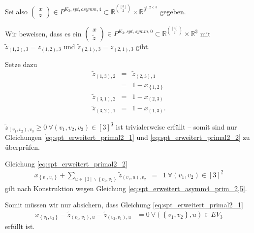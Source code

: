 \documentclass[10p,a4paper,BCOR = 12mm, DIV=15]{scrbook}
\begin{document}
{\begin{bew}
Sei also $\left(\begin{array}{c}
x \\
z
\end{array}\right) \in P^{K_3, spt, asymm, 4} \subset \mathbb{R}^{\left[3\right] \choose 2} \times \mathbb{R}^{\underline{3}^{1, 2 < 3}}$ gegeben.

Wir beweisen, dass es ein $\left(
\begin{array}{c}
x \\
\widetilde{z}
\end{array}
\right) \in P^{K_3, spt, symm, 0} \subset \mathbb{R}^{\left[n\right] \choose 2} \times \mathbb{R}^{\underline{3}}$ mit $\widetilde{z}_{\left(1, 2\right), 3} = z_{\left(1, 2\right), 3}$ und $\widetilde{z}_{\left(2, 1\right), 3} = z_{\left(2, 1\right), 3}$ gibt.

Setze dazu
\begin{eqnarray*}
\widetilde{z}_{\left(1, 3\right), 2} & = & \widetilde{z}_{\left(2, 3\right), 1} \\
& = & 1 - x_{\left\{1, 2\right\}} \\
\widetilde{z}_{\left(3, 1\right), 2} & = & 1 - x_{\left(2, 3\right)} \\
\widetilde{z}_{\left(3, 2\right), 1} & = & 1 - x_{\left(1, 3\right)}.
\end{eqnarray*}

$\widetilde{z}_{\left(v_1, v_2\right), v_3} \geq 0 \ \forall \left(v_1, v_2, v_3\right) \in \left[3\right]^{\underline{3}}$ ist trivialerweise erfüllt -- somit sind nur Gleichungen \eqref{eq:spt_erweitert_primal2_1} und \eqref{eq:spt_erweitert_primal2_2} zu überprüfen.

Gleichung \eqref{eq:spt_erweitert_primal2_2}
\begin{eqnarray*}
x_{\left\{v_1, v_2\right\}} + \sum_{u\in[3]\backslash\left\{v_1, v_2\right\}} \widetilde{z}_{\left(v_1, u\right), v_2} & = & 1\ \forall \left(v_1, v_2\right)\in [3]^{\underline{2}}
\end{eqnarray*}
gilt nach Konstruktion wegen Gleichung \eqref{eq:spt_erweitert_asymm4_prim_2,5}.

Somit müssen wir nur absichern, dass Gleichung \eqref{eq:spt_erweitert_primal2_1}
\begin{eqnarray*}
x_{\left\{v_1, v_2\right\}} - \widetilde{z}_{\left(v_1, v_2\right), u} - \widetilde{z}_{\left(v_2, v_1\right), u} & = 0\ \forall \left(\left\{v_1, v_2\right\}, u\right)\in EV_3
\end{eqnarray*}
erfüllt ist.


\end{bew}}
\end{document}
